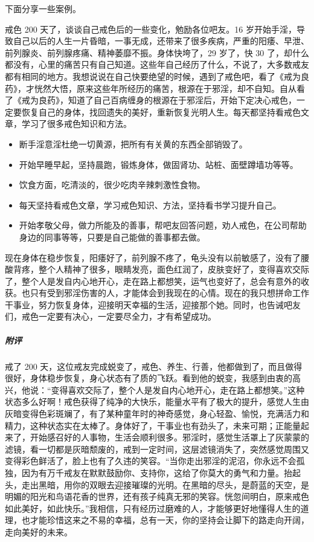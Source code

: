 下面分享一些案例。

\begin{case}
    戒色 200 天了，谈谈自己戒色后的一些变化，勉励各位吧友。16 岁开始手淫，导致自己以后的人生一片昏暗，一事无成，还带来了很多疾病，严重的阳痿、早泄、前列腺炎、前列腺疼痛、精神萎靡不振。身体快垮了，29 岁了，快 30 了，却什么都没有，心里的痛苦只有自己知道。这些年自己经历了什么，不说了，大多数戒友都有相同的地方。我想说说在自己快要绝望的时候，遇到了戒色吧，看了《戒为良药》，才恍然大悟，原来这些年所经历的痛苦，根源在于邪淫，却不自知。自从看了《戒为良药》，知道了自己百病缠身的根源在于邪淫后，开始下定决心戒色，一定要恢复自己的身体，找回遗失的美好，重新恢复光明人生。每天都坚持看戒色文章，学习了很多戒色知识和方法。\begin{itemize}
        \item 断手淫意淫杜绝一切黄源，把所有有关黄的东西全部销毁了。
        \item 开始早睡早起，坚持晨跑，锻炼身体，做固肾功、站桩、面壁蹲墙功等等。
        \item 饮食方面，吃清淡的，很少吃肉辛辣刺激性食物。
        \item 每天坚持看戒色文章，学习戒色知识、方法，坚持看书学习提升自己。
        \item 开始孝敬父母，做力所能及的善事，帮吧友回答问题，劝人戒色，在公司帮助身边的同事等等，只要是自己能做的善事都去做。
    \end{itemize} 现在身体在稳步恢复，阳痿好了，前列腺不疼了，龟头没有以前敏感了，没有了腰酸背疼，整个人精神了很多，眼睛发亮，面色红润了，皮肤变好了，变得喜欢交际了，整个人是发自内心地开心，走在路上都想笑，运气也变好了，总会有意外的收获。也只有受到邪淫伤害的人，才能体会到我现在的心情。现在的我只想拼命工作干事业，努力恢复身体，迎接明天幸福的生活，迎接那个她。同时，也告诫吧友们，戒色一定要有决心，一定要尽全力，才有希望成功。
    \subparagraph{附评} 戒了 200 天，这位戒友完成蜕变了，戒色、养生、行善，他都做到了，而且做得很好，身体稳步恢复，身心状态有了质的飞跃。看到他的蜕变，我感到由衷的高兴，他说：“变得喜欢交际了，整个人是发自内心地开心，走在路上都想笑。”这种状态多么好啊！戒色获得了纯净的大快乐，能量水平有了极大的提升，感觉人生由灰暗变得色彩斑斓了，有了某种童年时的神奇感觉，身心轻盈、愉悦，充满活力和精力，这种状态实在太棒了。身体好了，干事业也有劲头了，未来可期；正能量起来了，开始感召好的人事物，生活会顺利很多。邪淫时，感觉生活罩上了灰蒙蒙的滤镜，看一切都是灰暗颓废的，戒到一定时间，这层滤镜消失了，突然感觉周围又变得彩色鲜活了，脸上也有了久违的笑容。“当你走出邪淫的泥沼，你永远不会孤独，因为有万千戒友在默默鼓励你、支持你，这给了你莫大的勇气和力量。抬起头，走出黑暗，用你的双眼去迎接璀璨的光明。在黑暗的尽头，是蔚蓝的天空，是明媚的阳光和鸟语花香的世界，还有孩子纯真无邪的笑容。恍忽间明白，原来戒色如此美好，如此快乐。”我相信，只有经历过磨难的人，才能够更好地懂得人生的道理，也才能珍惜这来之不易的幸福，总有一天，你的坚持会让脚下的路走向开阔，走向美好的未来。
\end{case}

